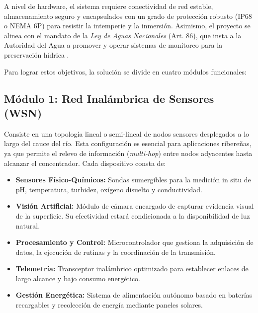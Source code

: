 A nivel de hardware, el sistema requiere conectividad de red estable, almacenamiento seguro y encapsulados con un grado de protección robusto (IP68 o NEMA 6P) para resistir la intemperie y la inmersión. Asimismo, el proyecto se alinea con el mandato de la \textit{Ley de Aguas Nacionales} (Art. 86), que insta a la Autoridad del Agua a promover y operar sistemas de monitoreo para la preservación hídrica \cite{LAN2024}.

Para lograr estos objetivos, la solución se divide en cuatro módulos funcionales:

\subsection{Módulo 1: Red Inalámbrica de Sensores (WSN)}
Consiste en una topología lineal o semi-lineal de nodos sensores desplegados a lo largo del cauce del río. Esta configuración es esencial para aplicaciones ribereñas, ya que permite el relevo de información (\textit{multi-hop}) entre nodos adyacentes hasta alcanzar el concentrador. Cada dispositivo consta de:
\begin{itemize}
  \item \textbf{Sensores Físico-Químicos:} Sondas sumergibles para la medición in situ de pH, temperatura, turbidez, oxígeno disuelto y conductividad.
  \item \textbf{Visión Artificial:} Módulo de cámara encargado de capturar evidencia visual de la superficie. Su efectividad estará condicionada a la disponibilidad de luz natural.
  \item \textbf{Procesamiento y Control:} Microcontrolador que gestiona la adquisición de datos, la ejecución de rutinas y la coordinación de la transmisión.
  \item \textbf{Telemetría:} Transceptor inalámbrico optimizado para establecer enlaces de largo alcance y bajo consumo energético.
  \item \textbf{Gestión Energética:} Sistema de alimentación autónomo basado en baterías recargables y recolección de energía mediante paneles solares.
\end{itemize}


